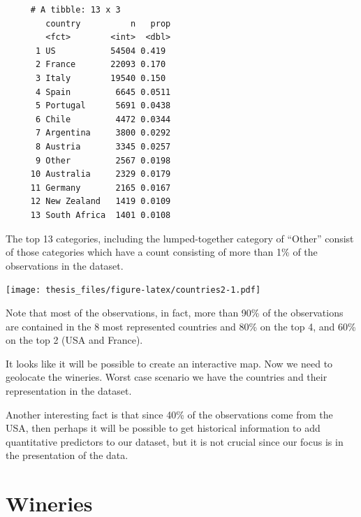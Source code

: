 \documentclass[12pt,twoside]{amherstthesis}
\begin{document}
\begin{verbatim}
     # A tibble: 13 x 3
        country          n   prop
        <fct>        <int>  <dbl>
      1 US           54504 0.419 
      2 France       22093 0.170 
      3 Italy        19540 0.150 
      4 Spain         6645 0.0511
      5 Portugal      5691 0.0438
      6 Chile         4472 0.0344
      7 Argentina     3800 0.0292
      8 Austria       3345 0.0257
      9 Other         2567 0.0198
     10 Australia     2329 0.0179
     11 Germany       2165 0.0167
     12 New Zealand   1419 0.0109
     13 South Africa  1401 0.0108
\end{verbatim}
The top 13 categories, including the lumped-together category of
``Other'' consist of those categories which have a count consisting of
more than 1\% of the observations in the dataset.

\texttt{[image: thesis\_files/figure-latex/countries2-1.pdf]}

Note that most of the observations, in fact, more than 90\% of the
observations are contained in the 8 most represented countries and 80\%
on the top 4, and 60\% on the top 2 (USA and France).

It looks like it will be possible to create an interactive map. Now we
need to geolocate the wineries. Worst case scenario we have the
countries and their representation in the dataset.

Another interesting fact is that since 40\% of the observations come
from the USA, then perhaps it will be possible to get historical
information to add quantitative predictors to our dataset, but it is not
crucial since our focus is in the presentation of the data.

\section{Wineries}\label{wineries}
\end{document}
